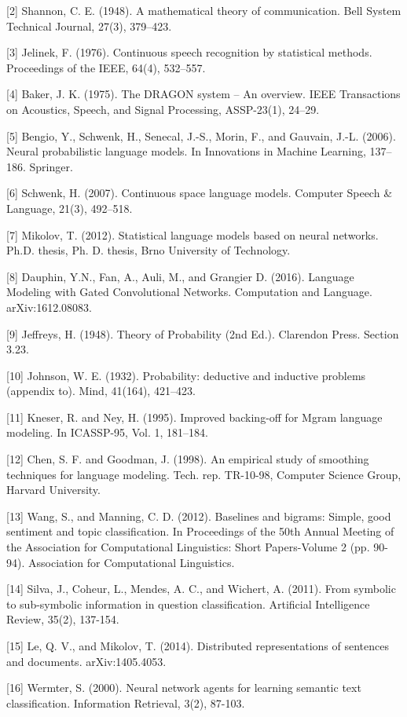 \documentclass{article}
\begin{document}
[2] Shannon, C. E. (1948). A mathematical theory of communication. Bell System Technical Journal, 27(3), 379–423.

[3] Jelinek, F. (1976). Continuous speech recognition by statistical methods. Proceedings of the IEEE, 64(4), 532–557.

[4] Baker, J. K. (1975). The DRAGON system – An overview. IEEE Transactions on Acoustics, Speech, and Signal Processing, ASSP-23(1), 24–29.

[5] Bengio, Y., Schwenk, H., Senecal, J.-S., Morin, F., and Gauvain, J.-L. (2006). Neural probabilistic language models. In Innovations in Machine Learning, 137–186. Springer.

[6] Schwenk, H. (2007). Continuous space language models. Computer Speech \& Language, 21(3), 492–518.

[7] Mikolov, T. (2012). Statistical language models based on neural networks. Ph.D. thesis, Ph. D. thesis, Brno University of Technology.

[8] Dauphin, Y.N., Fan, A., Auli, M., and Grangier D. (2016). Language Modeling with Gated Convolutional Networks. Computation and Language. arXiv:1612.08083.

[9] Jeffreys, H. (1948). Theory of Probability (2nd Ed.). Clarendon Press. Section 3.23.

[10] Johnson, W. E. (1932). Probability: deductive and inductive problems (appendix to). Mind, 41(164), 421–423.

[11] Kneser, R. and Ney, H. (1995). Improved backing-off for Mgram language modeling. In ICASSP-95, Vol. 1, 181–184.

[12] Chen, S. F. and Goodman, J. (1998). An empirical study of smoothing techniques for language modeling. Tech. rep. TR-10-98, Computer Science Group, Harvard University.

[13] Wang, S., and Manning, C. D. (2012). Baselines and bigrams: Simple, good sentiment and topic classification. In Proceedings of the 50th Annual Meeting of the Association for Computational Linguistics: Short Papers-Volume 2 (pp. 90-94). Association for Computational Linguistics.

[14] Silva, J., Coheur, L., Mendes, A. C., and Wichert, A. (2011). From symbolic to sub-symbolic information in question classification. Artificial Intelligence Review, 35(2), 137-154.

[15] Le, Q. V., and Mikolov, T. (2014). Distributed representations of sentences and documents. arXiv:1405.4053.

[16] Wermter, S. (2000). Neural network agents for learning semantic text classification. Information Retrieval, 3(2), 87-103.
\end{document}
